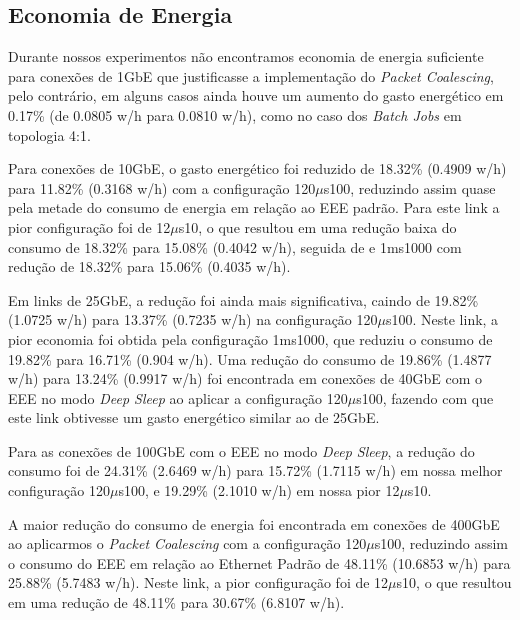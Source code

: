 \subsection{Economia de Energia}

Durante nossos experimentos não encontramos economia de energia suficiente para conexões de 1GbE que justificasse a implementação do \emph{Packet Coalescing}, pelo contrário, em alguns casos ainda houve um aumento do gasto energético em 0.17\% (de 0.0805 w/h para 0.0810 w/h), como no caso dos \emph{Batch Jobs} em topologia 4:1.

Para conexões de 10GbE, o gasto energético foi reduzido de 18.32\% (0.4909 w/h) para 11.82\% (0.3168 w/h) com a configuração 120$\mu$s100, reduzindo assim quase pela metade do consumo de energia em relação ao EEE padrão. Para este link a pior configuração foi de 12$\mu$s10, o que resultou em uma redução baixa do consumo de 18.32\% para 15.08\% (0.4042 w/h), seguida de e 1ms1000 com redução de 18.32\% para 15.06\% (0.4035 w/h).

Em links de 25GbE, a redução foi ainda mais significativa, caindo de 19.82\% (1.0725 w/h) para 13.37\% (0.7235 w/h) na configuração 120$\mu$s100. Neste link, a pior economia foi obtida pela configuração 1ms1000, que reduziu o consumo de 19.82\% para 16.71\% (0.904 w/h). Uma redução do consumo de 19.86\% (1.4877 w/h) para 13.24\% (0.9917 w/h) foi encontrada em conexões de 40GbE com o EEE no modo \emph{Deep Sleep} ao aplicar a configuração 120$\mu$s100, fazendo com que este link obtivesse um gasto energético similar ao de 25GbE.

Para as conexões de 100GbE com o EEE no modo \emph{Deep Sleep}, a redução do consumo foi de 24.31\% (2.6469 w/h) para 15.72\% (1.7115 w/h) em nossa melhor configuração 120$\mu$s100, e 19.29\% (2.1010 w/h) em nossa pior 12$\mu$s10.

A maior redução do consumo de energia foi encontrada em conexões de 400GbE ao aplicarmos o \emph{Packet Coalescing} com a configuração 120$\mu$s100, reduzindo assim o consumo do EEE em relação ao Ethernet Padrão de 48.11\% (10.6853 w/h) para 25.88\% (5.7483 w/h). Neste link, a pior configuração foi de 12$\mu$s10, o que resultou em uma redução de 48.11\% para 30.67\% (6.8107 w/h).

